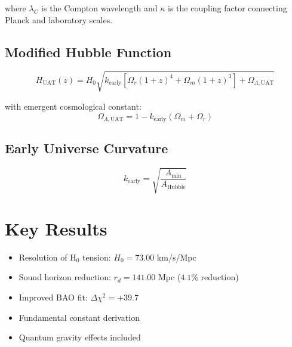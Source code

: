 \documentclass[12pt]{article}
\begin{document}
        where $\lambda_C$ is the Compton wavelength and $\kappa$ is the coupling factor connecting Planck and laboratory scales.

        \subsection{Modified Hubble Function}

        \begin{equation}
        H_{\text{UAT}}(z) = H_0 \sqrt{k_{\text{early}}[\Omega_r(1+z)^4 + \Omega_m(1+z)^3] + \Omega_{\Lambda,\text{UAT}}}
        \end{equation}

        with emergent cosmological constant:
        \begin{equation}
        \Omega_{\Lambda,\text{UAT}} = 1 - k_{\text{early}}(\Omega_m + \Omega_r)
        \end{equation}

        \subsection{Early Universe Curvature}

        \begin{equation}
        k_{\text{early}} = \sqrt{\frac{A_{\text{min}}}{A_{\text{Hubble}}}}
        \end{equation}

        \section{Key Results}

        \begin{itemize}
        \item Resolution of H$_0$ tension: $H_0 = 73.00$ km/s/Mpc
        \item Sound horizon reduction: $r_d = 141.00$ Mpc ($4.1\%$ reduction)
        \item Improved BAO fit: $\Delta\chi^2 = +39.7$
        \item Fundamental constant derivation
        \item Quantum gravity effects included
        \end{itemize}

        
\end{document}
